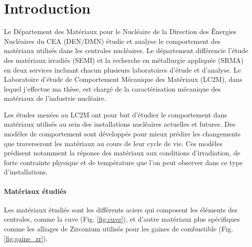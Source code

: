 \documentclass[11pt,class=article,float=false,crop=false]{standalone}
\begin{document}
\part*{Introduction}

Le Département des Matériaux pour le Nucléaire de la Direction des Énergies Nucléaires du CEA (DEN/DMN) étudie et analyse le comportement des matériaux utilisés dans les centrales nucléaires. Le département différencie l'étude des matériaux irradiés (SEMI) et la recherche en métallurgie appliquée (SRMA) en deux services incluant chacun plusieurs laboratoires d'étude et d'analyse. Le Laboratoire d'étude de Comportement Mécanique des Matériaux (LC2M), dans lequel j'effectue ma thèse, est chargé de la caractérisation mécanique des matériaux de l'industrie nucléaire.

Les études menées au LC2M ont pour but d'étudier le comportement dans matériaux utilisés au sein des installations nucléaires actuelles et futures. Des modèles de comportement sont développés pour mieux prédire les changements que traverseront les matériaux au cours de leur cycle de vie. Ces modèles prédisent notamment la réponse des matériaux aux conditions d'irradiation, de forte contrainte physique et de température que l'on peut observer dans ce type d'installations.

\subsection*{Matériaux étudiés}

Les matériaux étudiés sont les différents aciers qui composent les éléments des centrales, comme la cuve (Fig. \ref{fig:cuve}), et d'autre matériaux plus spécifiques comme les alliages de Zirconium utilisés pour les gaines de combustible (Fig. \ref{fig:gaine_zr}).
\end{document}
